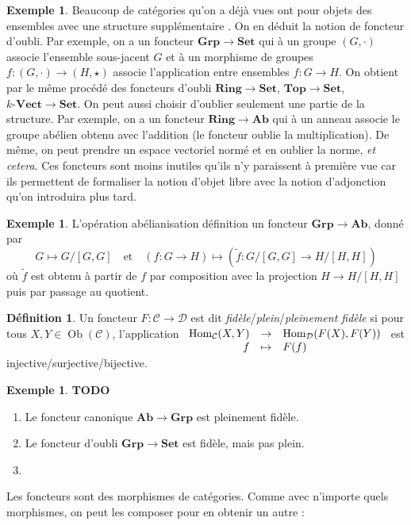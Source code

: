 \documentclass{article}
\newcommand{\cat}{\mathcal{C}}
\newcommand{\catt}{\mathcal{D}}
\newcommand{\Set}{\mathbf{Set}}
\newcommand{\Top}{\mathbf{Top}}
\newcommand{\Grp}{\mathbf{Grp}}
\newcommand{\Ab}{\mathbf{Ab}}
\newcommand{\Vectcat}{\mathbf{Vect}}
\newcommand{\Ring}{\mathbf{Ring}}
\DeclareMathOperator{\Ob}{Ob}
\DeclareMathOperator{\Hom}{Hom}
\newcommand{\todo}{\textbf{TODO}}
\newcommand{\applic}[4]{\begin{array}[t]{rcl}
#1 & \to & #2 \\
#3 & \mapsto & #4
\end{array}}
\theoremstyle{plain}
\theoremstyle{definition}
\newtheorem{definition}[theorem]{Définition}
\newtheorem{example}[theorem]{Exemple}
\theoremstyle{remark}
\begin{document}
\begin{example} Beaucoup de catégories qu'on a déjà vues ont pour objets des \og ensembles avec une structure supplémentaire \fg. On en déduit la notion de foncteur d'oubli. Par exemple, on a un foncteur $\Grp \to \Set$ qui à un groupe $(G,\cdot)$ associe l'ensemble sous-jacent $G$ et à un morphisme de groupes $f : (G,\cdot) \to (H,\star)$ associe l'application entre ensembles $f : G\to H$. On obtient par le même procédé des foncteurs d'oubli $\Ring \to \Set$, $\Top \to \Set$, $k\text{-}\Vectcat \to \Set$. On peut aussi choisir d'oublier seulement une partie de la structure. Par exemple, on a un foncteur $\Ring \to \Ab$ qui à un anneau associe le groupe abélien obtenu avec l'addition (le foncteur oublie la multiplication). De même, on peut prendre un espace vectoriel normé et en oublier la norme, \emph{et cetera}. Ces foncteurs sont moins inutiles qu'ils n'y paraissent à première vue car ils permettent de formaliser la notion d'\og objet libre \fg avec la notion d'adjonction qu'on introduira plus tard.
\end{example}

\begin{example}
    L'opération abélianisation définition un foncteur $\Grp \to \Ab$, donné par
    \[G \mapsto G/[G,G] \quad \text{et} \quad (f : G \to H) \mapsto (\tilde{f} : G/[G,G] \to H/[H,H])\]
    où $\tilde{f}$ est obtenu à partir de $f$ par composition avec la projection $H \to H/[H,H]$ puis par passage au quotient. 
\end{example}

\begin{definition}
    Un foncteur $F : \cat \to \catt$ est dit \emph{fidèle}/\emph{plein}/\emph{pleinement fidèle} si pour tous $X,Y \in \Ob(\cat)$, l'application $\applic{\Hom_\cat (X,Y)}{\Hom_\catt(F(X),F(Y))}{f}{F(f)}$ est injective/surjective/bijective.
\end{definition}

\begin{example} \todo
    \begin{enumerate}
        \item Le foncteur canonique $\Ab \to \Grp$ est pleinement fidèle.
        \item Le foncteur d'oubli $\Grp \to \Set$ est fidèle, mais pas plein.
        \item 
    \end{enumerate}
\end{example}

Les foncteurs sont des morphismes de catégories. Comme avec n'importe quels morphismes, on peut les composer pour en obtenir un autre :
\end{document}

